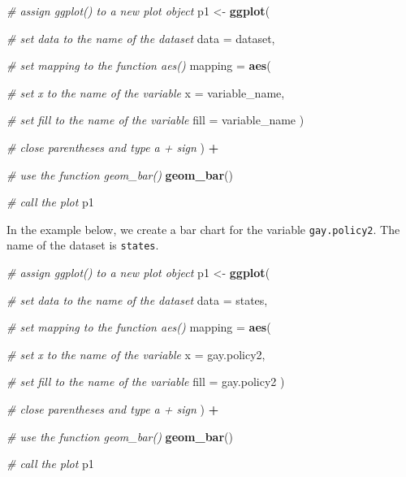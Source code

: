 \documentclass[
]{book}
\newenvironment{Shaded}{\begin{snugshade}}{\end{snugshade}}
\newcommand{\AttributeTok}[1]{\textcolor[rgb]{0.13,0.29,0.53}{#1}}
\newcommand{\CommentTok}[1]{\textcolor[rgb]{0.56,0.35,0.01}{\textit{#1}}}
\newcommand{\FunctionTok}[1]{\textcolor[rgb]{0.13,0.29,0.53}{\textbf{#1}}}
\newcommand{\NormalTok}[1]{#1}
\newcommand{\OtherTok}[1]{\textcolor[rgb]{0.56,0.35,0.01}{#1}}
\newcommand{\SpecialCharTok}[1]{\textcolor[rgb]{0.81,0.36,0.00}{\textbf{#1}}}
\begin{document}
\begin{Shaded}
\begin{Highlighting}[]
\CommentTok{\# assign ggplot() to a new plot object}
\NormalTok{p1 }\OtherTok{\textless{}{-}} \FunctionTok{ggplot}\NormalTok{(}
  
  \CommentTok{\# set data to the name of the dataset}
  \AttributeTok{data =}\NormalTok{ dataset,}
  
  \CommentTok{\# set \textasciigrave{}mapping\textasciigrave{} to the function \textasciigrave{}aes()\textasciigrave{}}
  \AttributeTok{mapping =} \FunctionTok{aes}\NormalTok{(}
    
    \CommentTok{\# set \textasciigrave{}x\textasciigrave{} to the name of the variable}
    \AttributeTok{x =}\NormalTok{ variable\_name,}
    
    \CommentTok{\# set \textasciigrave{}fill\textasciigrave{} to the name of the variable}
    \AttributeTok{fill =}\NormalTok{ variable\_name}
\NormalTok{  )}
  
  \CommentTok{\# close parentheses and type a + sign}
\NormalTok{) }\SpecialCharTok{+}
  
  \CommentTok{\# use the function \textasciigrave{}geom\_bar()\textasciigrave{}}
  \FunctionTok{geom\_bar}\NormalTok{()}

\CommentTok{\# call the plot}
\NormalTok{p1}
\end{Highlighting}
\end{Shaded}

In the example below, we create a bar chart for the variable \texttt{gay.policy2}. The name of the dataset is \texttt{states}.

\begin{Shaded}
\begin{Highlighting}[]
\CommentTok{\# assign ggplot() to a new plot object}
\NormalTok{p1 }\OtherTok{\textless{}{-}} \FunctionTok{ggplot}\NormalTok{(}
  
  \CommentTok{\# set data to the name of the dataset}
  \AttributeTok{data =}\NormalTok{ states,}
  
  \CommentTok{\# set \textasciigrave{}mapping\textasciigrave{} to the function \textasciigrave{}aes()\textasciigrave{}}
  \AttributeTok{mapping =} \FunctionTok{aes}\NormalTok{(}
    
    \CommentTok{\# set \textasciigrave{}x\textasciigrave{} to the name of the variable}
    \AttributeTok{x =}\NormalTok{ gay.policy2,}
    
    \CommentTok{\# set \textasciigrave{}fill\textasciigrave{} to the name of the variable}
    \AttributeTok{fill =}\NormalTok{ gay.policy2}
\NormalTok{  )}
  
  \CommentTok{\# close parentheses and type a + sign}
\NormalTok{) }\SpecialCharTok{+}
  
  \CommentTok{\# use the function \textasciigrave{}geom\_bar()\textasciigrave{}}
  \FunctionTok{geom\_bar}\NormalTok{()}

\CommentTok{\# call the plot}
\NormalTok{p1}
\end{Highlighting}
\end{Shaded}
\end{document}
